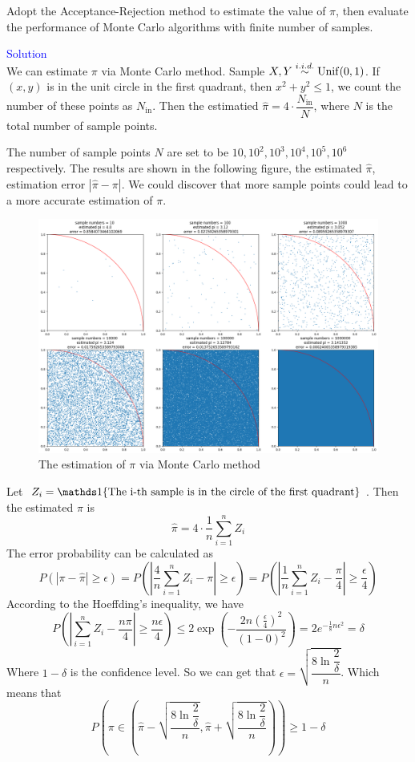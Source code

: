 \begin{homeworkProblem}

Adopt the Acceptance-Rejection method to estimate the value of $\pi$, then evaluate the performance of Monte Carlo algorithms with finite number of samples.

\textcolor{blue}{Solution} \\

We can estimate $\pi$ via Monte Carlo method. Sample $X, Y\stackrel{i.i.d.}{\sim}\operatorname{Unif}(0,1)$. If $(x,y)$ is in the unit circle in the first quadrant, then $x^2+y^2\leq 1$, we count the number of these points as $N_{\text{in}}$. Then the estimatied $\hat{\pi}=4\cdot\dfrac{N_{\text{in}}}{N}$, where $N$ is the total number of sample points.

The number of sample points $N$ are set to be $10, 10^2, 10^3, 10^4, 10^5, 10^6$ respectively. The results are shown in the following figure, the estimated $\hat{\pi}$, estimation error $|\hat{\pi}-\pi|$. We could discover that more sample points could lead to a more accurate estimation of $\pi$.

\begin{figure}[h]
    \centering
    \includegraphics[width=\textwidth]{./figure/p4/simulated_result.png}
    \caption{The estimation of $\pi$ via Monte Carlo method}
\end{figure}

Let $Z_i=\I\{\text{The i-th sample is in the circle of the first quadrant}\}$. Then the estimated $\pi$ is
$$\hat{\pi}=4\cdot\dfrac{1}{n}\sum_{i=1}^n Z_i$$
The error probability can be calculated as
$$P\left(|\pi-\hat{\pi}|\geq \epsilon \right) = P\left(\left|\dfrac{4}{n}\sum_{i=1}^n Z_i-\pi\right|\geq\epsilon\right)=P\left(\left|\dfrac{1}{n}\sum_{i=1}^n Z_i-\dfrac{\pi}{4}\right|\geq\dfrac{\epsilon}{4}\right)$$
According to the Hoeffding's inequality, we have
$$P\left(\left|\sum_{i=1}^n Z_i-\dfrac{n\pi}{4}\right|\geq\dfrac{n\epsilon}{4}\right)\leq 2\exp\left(-\dfrac{2n\left(\frac{\epsilon}{4}\right)^2}{(1-0)^2}\right)=2e^{-\frac{1}{8}n\epsilon^2}=\delta$$
Where $1-\delta$ is the confidence level. So we can get that $\epsilon = \sqrt{\dfrac{8\ln\dfrac{2}{\delta}}{n}}$. Which means that
$$P\left(\pi\in\left(\hat{\pi}-\sqrt{\dfrac{8\ln\dfrac{2}{\delta}}{n}}, \hat{\pi}+\sqrt{\dfrac{8\ln\dfrac{2}{\delta}}{n}}\right)\right)\geq 1-\delta$$


\end{homeworkProblem}
